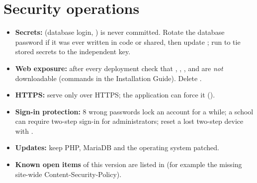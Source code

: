 \documentclass[11pt,a4paper]{article}
\begin{document}
\section{Security operations}
\begin{itemize}
\item \textbf{Secrets:}  (database login, ) is never committed. Rotate the database password if it was ever written in code or shared, then update ; run  to tie stored secrets to the independent key.
\item \textbf{Web exposure:} after every deployment check that , , ,  and  are \emph{not} downloadable (commands in the Installation Guide). Delete .
\item \textbf{HTTPS:} serve only over HTTPS; the application can force it ().
\item \textbf{Sign-in protection:} 8 wrong passwords lock an account for a while; a school can require two-step sign-in for administrators; reset a lost two-step device with .
\item \textbf{Updates:} keep PHP, MariaDB and the operating system patched.
\item \textbf{Known open items} of this version are listed in  (for example the missing site-wide Content-Security-Policy).
\end{itemize}
\end{document}
